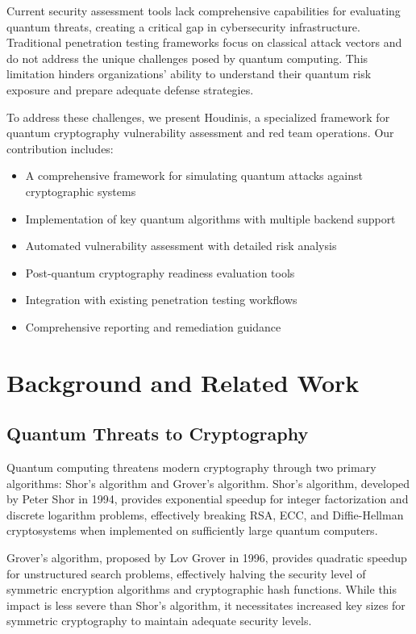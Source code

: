 \documentclass[11pt]{article}
\begin{document}
Current security assessment tools lack comprehensive capabilities for evaluating quantum threats, creating a critical gap in cybersecurity infrastructure. Traditional penetration testing frameworks focus on classical attack vectors and do not address the unique challenges posed by quantum computing. This limitation hinders organizations' ability to understand their quantum risk exposure and prepare adequate defense strategies.

To address these challenges, we present Houdinis, a specialized framework for quantum cryptography vulnerability assessment and red team operations. Our contribution includes:

\begin{itemize}
\item A comprehensive framework for simulating quantum attacks against cryptographic systems
\item Implementation of key quantum algorithms with multiple backend support
\item Automated vulnerability assessment with detailed risk analysis
\item Post-quantum cryptography readiness evaluation tools
\item Integration with existing penetration testing workflows
\item Comprehensive reporting and remediation guidance
\end{itemize}

\section{Background and Related Work}

\subsection{Quantum Threats to Cryptography}

Quantum computing threatens modern cryptography through two primary algorithms: Shor's algorithm and Grover's algorithm. Shor's algorithm, developed by Peter Shor in 1994, provides exponential speedup for integer factorization and discrete logarithm problems, effectively breaking RSA, ECC, and Diffie-Hellman cryptosystems when implemented on sufficiently large quantum computers.

Grover's algorithm, proposed by Lov Grover in 1996, provides quadratic speedup for unstructured search problems, effectively halving the security level of symmetric encryption algorithms and cryptographic hash functions. While this impact is less severe than Shor's algorithm, it necessitates increased key sizes for symmetric cryptography to maintain adequate security levels.
\end{document}
